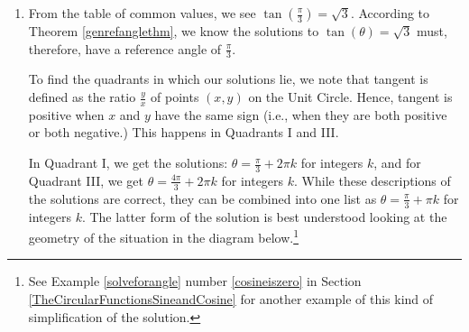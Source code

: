 \documentclass{ximera}
\begin{document}
\begin{example}
\begin{explanation}
\begin{enumerate}
\begin{enumerate}
\item From the table of common values, we see  $\tan\left(\frac{\pi}{3}\right) = \sqrt{3}$.  According to Theorem \ref{genrefanglethm}, we  know  the solutions to $\tan(\theta) = \sqrt{3}$ must, therefore, have a reference angle of $\frac{\pi}{3}$. 



To find the quadrants in which our solutions lie, we note that tangent is defined as the ratio $\frac{y}{x}$ of points $(x,y)$ on the Unit Circle.  Hence, tangent is positive when $x$ and $y$ have the same sign (i.e., when they are both positive or both negative.) This happens in Quadrants I and III. 



 In Quadrant I, we get the solutions: $\theta = \frac{\pi}{3} + 2\pi k$ for integers $k$, and for Quadrant III, we get $\theta = \frac{4\pi}{3} + 2\pi k$ for integers $k$.  While these descriptions of the solutions are correct, they can be combined into one list as $\theta = \frac{\pi}{3} + \pi k$ for integers $k$. The latter form of the solution is best understood looking at the geometry of the situation in the diagram below.\footnote{See Example \ref{solveforangle} number \ref{cosineiszero} in Section \ref{TheCircularFunctionsSineandCosine} for another example of this kind of simplification of the solution.}
 

\begin{image}
\end{image}
\end{enumerate}
\end{enumerate}
\end{explanation}
\end{example}
\end{document}

